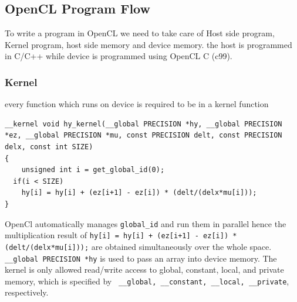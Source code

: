\subsection {OpenCL Program Flow}
To write a program in OpenCL we need to take care of Host side program, Kernel program, host side memory and device memory. the host is programmed in C/C++ while device is programmed using OpenCL C (c99).

\subsubsection{Kernel}
every function which runs on device is required to be in a kernel function

\lstset{language=C,caption=OpenCL Kernel function, label=kernel}
\begin{lstlisting}
__kernel void hy_kernel(__global PRECISION *hy, __global PRECISION *ez, __global PRECISION *mu, const PRECISION delt, const PRECISION delx, const int SIZE) 
{
	unsigned int i = get_global_id(0);
  if(i < SIZE)
    hy[i] = hy[i] + (ez[i+1] - ez[i]) * (delt/(delx*mu[i]));
}
\end{lstlisting}
OpenCl automatically manages \lstinline{global_id} and run them in parallel hence the multiplication result of  \lstinline{hy[i] = hy[i] + (ez[i+1] - ez[i]) * (delt/(delx*mu[i]));} are obtained simultaneously over the whole space.
\lstinline{__global PRECISION *hy} is used to pass an array into device memory. The kernel is only allowed read/write access to global, constant, local, and private memory, which is specified by \lstinline{ __global, __constant, __local, __private}, respectively.

